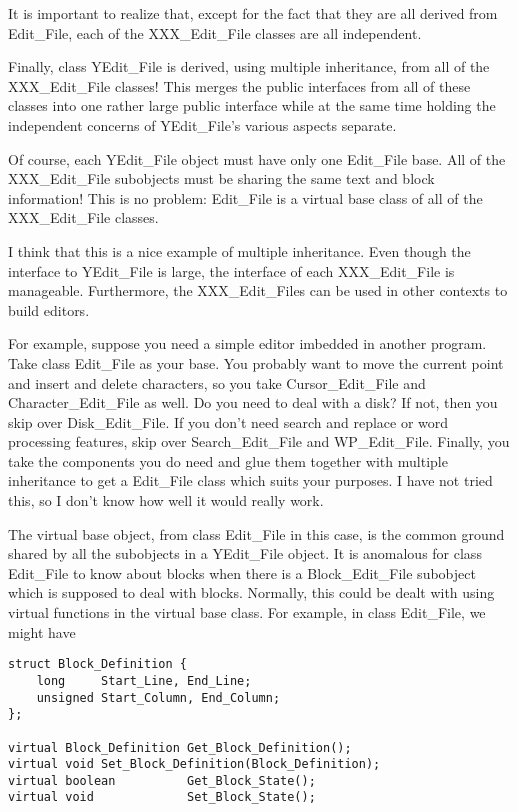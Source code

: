 It is important to realize that, except for the fact that they are all derived from Edit\_File,
each of the XXX\_Edit\_File classes are all independent.

Finally, class YEdit\_File is derived, using multiple inheritance, from all of the XXX\_Edit\_File
classes! This merges the public interfaces from all of these classes into one rather large
public interface while at the same time holding the independent concerns of YEdit\_File's various
aspects separate.

Of course, each YEdit\_File object must have only one Edit\_File base. All of the XXX\_Edit\_File
subobjects must be sharing the same text and block information! This is no problem: Edit\_File is
a virtual base class of all of the XXX\_Edit\_File classes.

I think that this is a nice example of multiple inheritance. Even though the interface to
YEdit\_File is large, the interface of each XXX\_Edit\_File is manageable. Furthermore, the
XXX\_Edit\_Files can be used in other contexts to build editors.

For example, suppose you need a simple editor imbedded in another program. Take class Edit\_File
as your base. You probably want to move the current point and insert and delete characters, so
you take Cursor\_Edit\_File and Character\_Edit\_File as well. Do you need to deal with a disk? If
not, then you skip over Disk\_Edit\_File. If you don't need search and replace or word processing
features, skip over Search\_Edit\_File and WP\_Edit\_File. Finally, you take the components you do
need and glue them together with multiple inheritance to get a Edit\_File class which suits your
purposes. I have not tried this, so I don't know how well it would really work.

The virtual base object, from class Edit\_File in this case, is the common ground shared by all
the subobjects in a YEdit\_File object. It is anomalous for class Edit\_File to know about blocks
when there is a Block\_Edit\_File subobject which is supposed to deal with blocks. Normally, this
could be dealt with using virtual functions in the virtual base class. For example, in class
Edit\_File, we might have

\begin{verbatim}
struct Block_Definition {
    long     Start_Line, End_Line;
    unsigned Start_Column, End_Column;
};

virtual Block_Definition Get_Block_Definition();
virtual void Set_Block_Definition(Block_Definition);
virtual boolean          Get_Block_State();
virtual void             Set_Block_State();
\end{verbatim}

